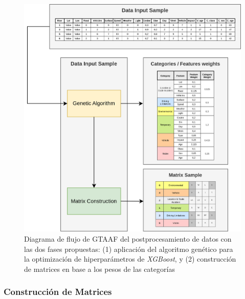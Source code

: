 \begin{figure}[H]
	\centering
	\includegraphics[width=14cm]{Figures/Postprocessing_2.png}
	\caption{Diagrama de flujo de GTAAF del postprocesamiento de datos con las dos fases propuestas: (1) aplicación del algoritmo genético para la optimización de hiperparámetros de \textit{XGBoost}, y (2) construcción de matrices en base a los pesos de las categorías}
	\label{PostprocessingStage}
\end{figure}

\subsubsection{Construcción de Matrices}

